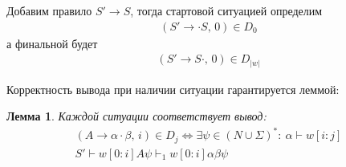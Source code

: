 \documentclass[a4paper,12pt]{article}
\theoremstyle{plain}
\newtheorem{lemma}{Лемма}[subsection]
\theoremstyle{definition}
\theoremstyle{remark}
\begin{document}
Добавим правило $S' \to S$, тогда стартовой ситуацией определим
\begin{align*}
	(S' \to \cdot S,\, 0) \in D_0
\end{align*}
а финальной будет
\begin{align*}
	(S' \to S\cdot,\, 0) \in D_{\vert w\vert}
\end{align*}

Корректность вывода при наличии ситуации гарантируется леммой:
\begin{lemma}
	Каждой ситуации соответствует вывод:
	\begin{align*}
		(A \to \alpha\cdot\beta,\, i) \in D_j \Leftrightarrow \exists \psi \in (N \cup \Sigma)^* :\: \alpha \vdash w[i : j] \\
		S' \vdash w[0:i]A\psi \vdash_1 w[0:i]\alpha\beta\psi
	\end{align*}
\end{lemma}
\end{document}

